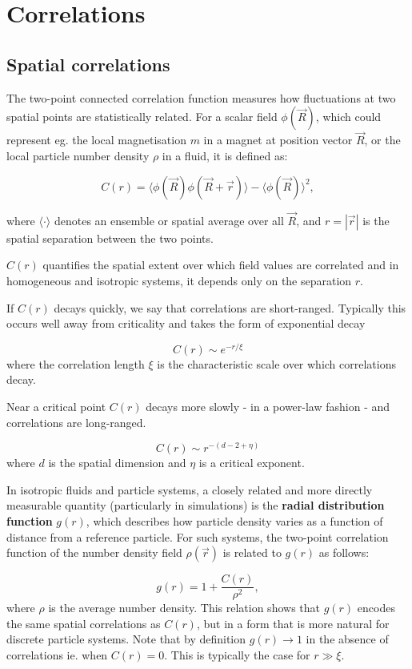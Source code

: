 \documentclass[
  letterpaper,
  DIV=11,
  numbers=noendperiod]{scrreprt}
\begin{document}
\section{Correlations}\label{sec-correlations}

\subsection{Spatial correlations}\label{spatial-correlations}

The two-point connected correlation function measures how fluctuations
at two spatial points are statistically related. For a scalar field
\(\phi(\vec{R})\), which could represent eg. the local magnetisation
\(m\) in a magnet at position vector \(\vec{R}\), or the local particle
number density \(\rho\) in a fluid, it is defined as:

\[
C(r) = \langle \phi(\vec{R}) \phi(\vec{R} + \vec{r}) \rangle - \langle \phi(\vec{R}) \rangle^2,
\]

where \(\langle \cdot \rangle\) denotes an ensemble or spatial average
over all \(\vec{R}\), and \(r = |\vec{r}|\) is the spatial separation
between the two points.

\(C(r)\) quantifies the spatial extent over which field values are
correlated and in homogeneous and isotropic systems, it depends only on
the separation \(r\).

If \(C(r)\) decays quickly, we say that correlations are short-ranged.
Typically this occurs well away from criticality and takes the form of
exponential decay

\[
  C(r) \sim e^{-r/\xi}
  \] where the correlation length \(\xi\) is the characteristic scale
over which correlations decay.

Near a critical point \(C(r)\) decays more slowly - in a power-law
fashion - and correlations are long-ranged.

\[
  C(r) \sim r^{-(d - 2 + \eta)}
  \] where \(d\) is the spatial dimension and \(\eta\) is a critical
exponent.

In isotropic fluids and particle systems, a closely related and more
directly measurable quantity (particularly in simulations) is the
\textbf{radial distribution function} \(g(r)\), which describes how
particle density varies as a function of distance from a reference
particle. For such systems, the two-point correlation function of the
number density field \(\rho(\vec{r})\) is related to \(g(r)\) as
follows:

\[
g(r) = 1+\frac{C(r)}{\rho^2},
\] where \(\rho\) is the average number density. This relation shows
that \(g(r)\) encodes the same spatial correlations as \(C(r)\), but in
a form that is more natural for discrete particle systems. Note that by
definition \(g(r)\to 1\) in the absence of correlations ie. when
\(C(r)=0\). This is typically the case for \(r\gg\xi\).
\end{document}
